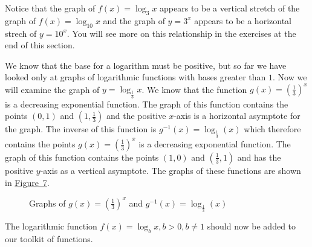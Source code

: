 \documentclass[10pt,]{book}
\theoremstyle{ptxdefinitionnotitle}
\theoremstyle{ptxdefinitiontitle}
\theoremstyle{ptxdefinitionnotitle}
\theoremstyle{ptxdefinitiontitle}
\theoremstyle{ptxdefinitionnotitle}
\theoremstyle{ptxdefinitiontitle}
\numberwithin{equation}{section}
\newcommand{\gt}{>}
\begin{document}
\hypertarget{p-337}{}%
Notice that the graph of \(f(x) = \log_3 x\) appears to be a vertical stretch of the graph of \(f(x) = \log_{10} x \) and the graph of \(y = 3^x\) appears to be a horizontal strech of \(y = 10^x\). You will see more on this relationship in the exercises at the end of this section.%
\par
\hypertarget{p-338}{}%
We know that the base for a logarithm must be positive, but so far we have looked only at graphs of logarithmic functions with bases greater than \(1\). Now we will examine the graph of \(y = \log_{\frac{1}{3}} x\). We know that the function \(g(x) = \left( \frac{1}{3} \right) ^ x\) is a decreasing exponential function. The graph of this function contains the points \(\left(0, 1 \right)\) and \(\left( 1, \frac{1}{3} \right)\) and the positive \(x\)-axis is a horizontal asymptote for the graph. The inverse of this function is \(g^{-1} (x) = \log_{\frac{1}{3}} (x)\) which therefore contains the points \(g(x) = \left( \frac{1}{3} \right) ^ x\) is a decreasing exponential function. The graph of this function contains the points \(\left(1, 0 \right)\) and \(\left( \frac{1}{3}, 1 \right)\) and has the positive \(y\)-axis as a vertical asymptote. The graphs of these functions are shown in \hyperref[graph-of-exp-log-base-3]{Figure~7}.%
\begin{figure}
\centering
{
}
\caption{Graphs of \(g(x) = \left( \frac{1}{3} \right) ^ x\) and \(g^{-1} (x) = \log_{\frac{1}{3}} (x)\)\label{graph-of-exp-log-base-3}}
\end{figure}
\hypertarget{p-339}{}%
The logarithmic function \(f(x) = \log_b x, b \gt 0, b \neq 1\) should now be added to our toolkit of functions.%
\end{document}
